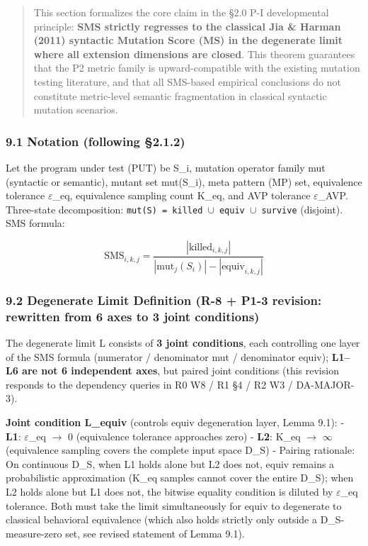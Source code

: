 \documentclass[review,12pt,authoryear]{elsarticle}
\begin{document}
\begin{quote}
This section formalizes the core claim in the §2.0 P-I developmental
principle: \textbf{SMS strictly regresses to the classical Jia \& Harman
(2011) syntactic Mutation Score (MS) in the degenerate limit where all
extension dimensions are closed}. This theorem guarantees that the P2
metric family is upward-compatible with the existing mutation testing
literature, and that all SMS-based empirical conclusions do not
constitute metric-level semantic fragmentation in classical syntactic
mutation scenarios.
\end{quote}

\subsubsection{9.1 Notation (following
§2.1.2)}\label{notation-following-2.1.2}

Let the program under test (PUT) be S\_i, mutation operator family mut
(syntactic or semantic), mutant set mut(S\_i), meta pattern (MP) set,
equivalence tolerance $\varepsilon$\_eq, equivalence sampling count K\_eq, and AVP
tolerance $\varepsilon$\_AVP. Three-state decomposition:
\texttt{mut(S)\ =\ killed\ $\cup$\ equiv\ $\cup$\ survive} (disjoint). SMS
formula:

\[
\text{SMS}_{i,k,j} = \frac{|\text{killed}_{i,k,j}|}{|\text{mut}_j(S_i)| - |\text{equiv}_{i,k,j}|}
\]

\subsubsection{9.2 Degenerate Limit Definition (R-8 + P1-3 revision:
rewritten from 6 axes to 3 joint
conditions)}\label{degenerate-limit-definition-r-8-p1-3-revision-rewritten-from-6-axes-to-3-joint-conditions}

The degenerate limit L consists of \textbf{3 joint conditions}, each
controlling one layer of the SMS formula (numerator / denominator mut /
denominator equiv); \textbf{L1--L6 are not 6 independent axes}, but
paired joint conditions (this revision responds to the dependency
queries in R0 W8 / R1 §4 / R2 W3 / DA-MAJOR-3).

\textbf{Joint condition L\_equiv} (controls equiv degeneration layer,
Lemma 9.1): - \textbf{L1}: $\varepsilon$\_eq $\to$ 0 (equivalence tolerance approaches
zero) - \textbf{L2}: K\_eq $\to$ $\infty$ (equivalence sampling covers the complete
input space D\_S) - Pairing rationale: On continuous D\_S, when L1 holds
alone but L2 does not, equiv remains a probabilistic approximation
(K\_eq samples cannot cover the entire D\_S); when L2 holds alone but L1
does not, the bitwise equality condition is diluted by $\varepsilon$\_eq tolerance.
Both must take the limit simultaneously for equiv to degenerate to
classical behavioral equivalence (which also holds strictly only outside
a D\_S-measure-zero set, see revised statement of Lemma 9.1).
\end{document}
